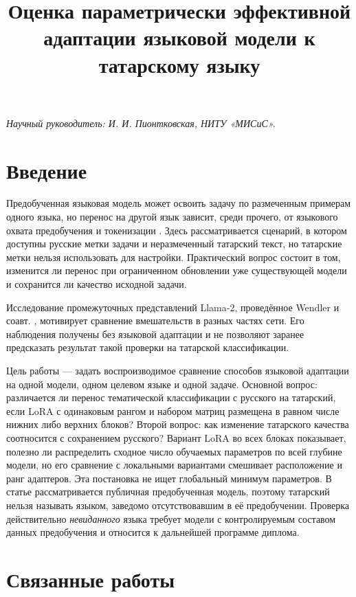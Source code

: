 \documentclass{misisarticle}
\title{Оценка параметрически эффективной адаптации языковой модели к татарскому языку}
\begin{document}
\maketitle
\noindent\emph{Научный руководитель: И. И. Пионтковская, НИТУ «МИСиС».}\par
\section{Введение}

Предобученная языковая модель может освоить задачу по размеченным примерам одного языка, но перенос на другой язык зависит, среди прочего, от языкового охвата предобучения и токенизации \cite{pfeiffer2020mad,csaki2023efficiently,adelani2023sib}. Здесь рассматривается сценарий, в котором доступны русские метки задачи и неразмеченный татарский текст, но татарские метки нельзя использовать для настройки. Практический вопрос состоит в том, изменится ли перенос при ограниченном обновлении уже существующей модели и сохранится ли качество исходной задачи.

Исследование промежуточных представлений Llama-2, проведённое Wendler и соавт. \cite{wendler2024llamas}, мотивирует сравнение вмешательств в разных частях сети. Его наблюдения получены без языковой адаптации и не позволяют заранее предсказать результат такой проверки на татарской классификации.

Цель работы — задать воспроизводимое сравнение способов языковой адаптации на одной модели, одном целевом языке и одной задаче. Основной вопрос: различается ли перенос тематической классификации с русского на татарский, если LoRA с одинаковым рангом и набором матриц размещена в равном числе нижних либо верхних блоков? Второй вопрос: как изменение татарского качества соотносится с сохранением русского? Вариант LoRA во всех блоках показывает, полезно ли распределить сходное число обучаемых параметров по всей глубине модели, но его сравнение с локальными вариантами смешивает расположение и ранг адаптеров. Эта постановка не ищет глобальный минимум параметров. В статье рассматривается публичная предобученная модель, поэтому татарский нельзя называть языком, заведомо отсутствовавшим в её предобучении. Проверка действительно \emph{невиданного} языка требует модели с контролируемым составом данных предобучения и относится к дальнейшей программе диплома.

\section{Связанные работы}
\end{document}
